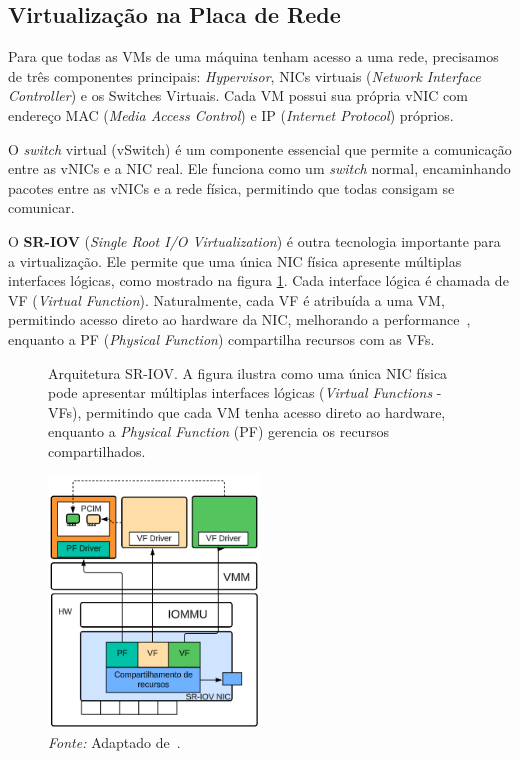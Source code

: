 \subsection{Virtualização na Placa de Rede}

Para que todas as VMs de uma máquina tenham acesso a uma rede, precisamos de três componentes principais: \textit{Hypervisor}, NICs virtuais (\textit{Network Interface Controller}) e os Switches Virtuais. Cada VM possui sua própria vNIC com endereço MAC (\textit{Media Access Control}) e IP (\textit{Internet Protocol}) próprios. 

O \textit{switch} virtual (vSwitch) é um componente essencial que permite a comunicação entre as vNICs e a NIC real. Ele funciona como um \textit{switch} normal, encaminhando pacotes entre as vNICs e a rede física, permitindo que todas consigam se comunicar.

O \textbf{SR-IOV} (\textit{Single Root I/O Virtualization}) é outra tecnologia importante para a virtualização. Ele permite que uma única NIC física apresente múltiplas interfaces lógicas, como mostrado na figura \ref{fig:single_root_IO_virtualization}. Cada interface lógica é chamada de VF (\textit{Virtual Function}). Naturalmente, cada VF é atribuída a uma VM, permitindo acesso direto ao hardware da NIC, melhorando a performance~\citep{dong2012high}, enquanto a PF (\textit{Physical Function}) compartilha recursos com as VFs.

\begin{figure}[htbp]
  \centering
  \caption{Arquitetura SR-IOV. A figura ilustra como uma única NIC física pode apresentar múltiplas interfaces lógicas (\textit{Virtual Functions} - VFs), permitindo que cada VM tenha acesso direto ao hardware, enquanto a \textit{Physical Function} (PF) gerencia os recursos compartilhados.}
  \includegraphics[width=0.5\textwidth]{images/single_root_IO_virtualization.png}
  \caption*{\textit{Fonte:} Adaptado de~\citep{dong2012high}.}
  \label{fig:single_root_IO_virtualization}
\end{figure}


